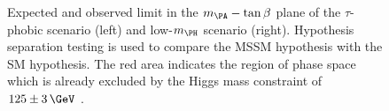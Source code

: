 \begin{figure}[tbh]
\caption[Expected and observed limit in the $m_{\PA}-\tan\beta$ plane of the
$\tau$-phobic scenario (left) and low-$m_{\PH}$ scenario (right).]
{Expected and observed limit in the $m_{\PA}-\tan\beta$ plane of the
$\tau$-phobic scenario (left) and low-$m_{\PH}$ scenario (right). Hypothesis
separation testing is used to compare the \ac{MSSM} hypothesis with the SM
hypothesis. The red area indicates the region of phase space which is already
excluded by the Higgs mass constraint of $125\pm3\,\GeV$ \cite{HIG-13-021}.}
\label{fig:tauphobiclowmH}
\end{figure}
